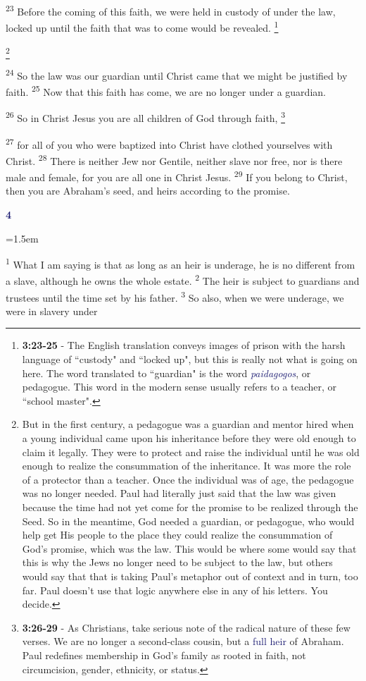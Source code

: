 \documentclass[12pt,twoside]{article}
\newcommand{\vs}[1]{\textsuperscript{#1}}
\newcommand{\vnote}[2]{%
  \begingroup
  \renewcommand\thefootnote{}%
  \footnote{\scriptsize \textbf{}#2}%
  \addtocounter{footnote}{-1}%
  \endgroup
}
\newcommand{\chapterWithIndent}[2]{%
  \noindent
  \begin{minipage}[t]{1cm}
    \vspace{-0.4\baselineskip}
    {\textcolor{MidnightBlue}{\fontsize{40pt}{48pt}\selectfont \textbf{#1}}}
  \end{minipage}%
  \hspace{0.3cm}%
  \begin{minipage}[t]{\dimexpr\linewidth - 1.5cm - 0.3cm\relax}
    \hangindent=1.5em
    \hangafter=3
    #2
    \vspace{0.05cm}
  \end{minipage}
}
\begin{document}
 \hspace{0.5cm} \vs{23} Before the coming of this faith, we were held in custody of under the law, locked up until the faith that was to come would be revealed.\vnote{23}{\textbf{3:23-25} - The English translation conveys images of prison with the harsh language of ``custody" and ``locked up", but this is really not what is going on here. The word translated to ``guardian" is the word \textcolor{MidnightBlue}{\textit{paidagogos}}, or pedagogue. This word in the modern sense usually refers to a teacher, or ``school master".}\vnote{23}{But in the first century, a pedagogue was a guardian and mentor hired when a young individual came upon his inheritance before they were old enough to claim it legally. They were to protect and raise the individual until he was old enough to realize the consummation of the inheritance. It was more the role of a protector than a teacher. Once the individual was of age, the pedagogue was no longer needed. Paul had literally just said that the law was given because the time had not yet come for the promise to be realized through the Seed. So in the meantime, God needed a guardian, or pedagogue, who would help get His people to the place they could realize the consummation of God's promise, which was the law. This would be where some would say that this is why the Jews no longer need to be subject to the law, but others would say that that is taking Paul's metaphor out of context and in turn, too far. Paul doesn't use that logic anywhere else in any of his letters. You decide.}
 \vs{24} So the law was our guardian until Christ came that we might be justified by faith.
 \vs{25} Now that this faith has come, we are no longer under a guardian.

 \vs{26} So in Christ Jesus you are all children of God through faith,\vnote{26}{\textbf{3:26-29} - As Christians, take serious note of the radical nature of these few verses. We are no longer a second-class cousin, but a \textcolor{MidnightBlue}{full heir} of Abraham. Paul redefines membership in God's family as rooted in faith, not circumcision, gender, ethnicity, or status.}
 \vs{27} for all of you who were baptized into Christ have clothed yourselves with Christ.
 \vs{28} There is neither Jew nor Gentile, neither slave nor free, nor is there male and female, for you are all one in Christ Jesus.
 \vs{29} If you belong to Christ, then you are Abraham's seed, and heirs according to the promise.

 \chapterWithIndent{4}{
    \vs{1} What I am saying is that as long as an heir is underage, he is no different from a slave, although he owns the whole estate.
    \vs{2} The heir is subject to guardians and trustees until the time set by his father.
    \vs{3} So also, when we were underage, we were in slavery under 
 }
 
\end{document}
